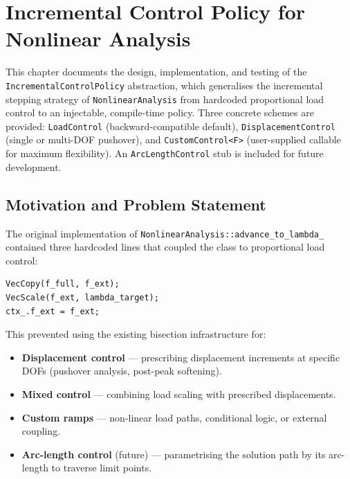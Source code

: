 
\chapter{Incremental Control Policy for Nonlinear Analysis}
\label{ch:incremental-control}

This chapter documents the design, implementation, and testing of the
\texttt{IncrementalControlPolicy} abstraction, which generalises the
incremental stepping strategy of \texttt{NonlinearAnalysis} from
hardcoded proportional load control to an injectable, compile-time
policy.  Three concrete schemes are provided: \texttt{LoadControl}
(backward-compatible default), \texttt{DisplacementControl} (single
or multi-DOF pushover), and \texttt{CustomControl<F>} (user-supplied
callable for maximum flexibility).  An \texttt{ArcLengthControl} stub
is included for future development.

\section{Motivation and Problem Statement}
\label{sec:ic-motivation}

The original implementation of \texttt{NonlinearAnalysis::advance\_to\_lambda\_}
contained three hardcoded lines that coupled the class to proportional load
control:

\begin{lstlisting}
VecCopy(f_full, f_ext);
VecScale(f_ext, lambda_target);
ctx_.f_ext = f_ext;
\end{lstlisting}

This prevented using the existing bisection infrastructure for:

\begin{itemize}
  \item \textbf{Displacement control} — prescribing displacement increments
        at specific DOFs (pushover analysis, post-peak softening).
  \item \textbf{Mixed control} — combining load scaling with prescribed
        displacements.
  \item \textbf{Custom ramps} — non-linear load paths, conditional logic,
        or external coupling.
  \item \textbf{Arc-length control} (future) — parametrising the solution
        path by its arc-length to traverse limit points.
\end{itemize}

